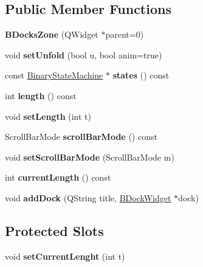 \subsection*{Public Member Functions}
\begin{DoxyCompactItemize}
\item 
\hypertarget{class_b_docks_zone_a2e49eff10d059d11b21080b386229350}{}\label{class_b_docks_zone_a2e49eff10d059d11b21080b386229350} 
{\bfseries B\+Docks\+Zone} (Q\+Widget $\ast$parent=0)
\item 
\hypertarget{class_b_docks_zone_aa5dbe8252e67c1c87baf2426261249c7}{}\label{class_b_docks_zone_aa5dbe8252e67c1c87baf2426261249c7} 
void {\bfseries set\+Unfold} (bool u, bool anim=true)
\item 
\hypertarget{class_b_docks_zone_a17c76aa2e7a6cd0abce28cfb902d0a88}{}\label{class_b_docks_zone_a17c76aa2e7a6cd0abce28cfb902d0a88} 
const \hyperlink{class_binary_state_machine}{Binary\+State\+Machine} $\ast$ {\bfseries states} () const
\item 
\hypertarget{class_b_docks_zone_abec3051abcee2cabaee7e47c7a1f11c3}{}\label{class_b_docks_zone_abec3051abcee2cabaee7e47c7a1f11c3} 
int {\bfseries length} () const
\item 
\hypertarget{class_b_docks_zone_ab8535df5e9b601099740e2a380ec0039}{}\label{class_b_docks_zone_ab8535df5e9b601099740e2a380ec0039} 
void {\bfseries set\+Length} (int t)
\item 
\hypertarget{class_b_docks_zone_a3becc194be2a889b313627099f52e9e7}{}\label{class_b_docks_zone_a3becc194be2a889b313627099f52e9e7} 
Scroll\+Bar\+Mode {\bfseries scroll\+Bar\+Mode} () const
\item 
\hypertarget{class_b_docks_zone_a5f057fe2f659983eb19a1fac4db60c7f}{}\label{class_b_docks_zone_a5f057fe2f659983eb19a1fac4db60c7f} 
void {\bfseries set\+Scroll\+Bar\+Mode} (Scroll\+Bar\+Mode m)
\item 
\hypertarget{class_b_docks_zone_a0b3632bfd405453b1dc860d6588b1efb}{}\label{class_b_docks_zone_a0b3632bfd405453b1dc860d6588b1efb} 
int {\bfseries current\+Length} () const
\item 
\hypertarget{class_b_docks_zone_ab18bd2b0737213b6a4a3487a555f961d}{}\label{class_b_docks_zone_ab18bd2b0737213b6a4a3487a555f961d} 
void {\bfseries add\+Dock} (Q\+String title, \hyperlink{class_b_dock_widget}{B\+Dock\+Widget} $\ast$dock)
\end{DoxyCompactItemize}
\subsection*{Protected Slots}
\begin{DoxyCompactItemize}
\item 
\hypertarget{class_b_docks_zone_ade5e2f8579546a8355b5c75befe842f5}{}\label{class_b_docks_zone_ade5e2f8579546a8355b5c75befe842f5} 
void {\bfseries set\+Current\+Lenght} (int t)
\end{DoxyCompactItemize}
